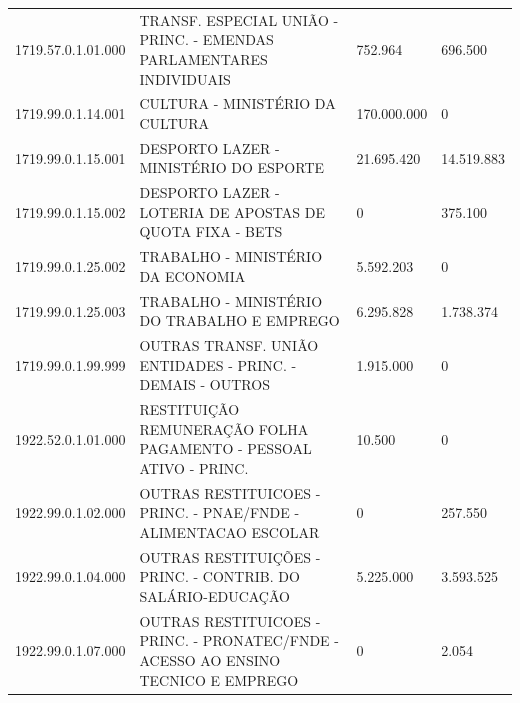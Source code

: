 \documentclass{article}
\begin{document}
\begin{longtable}[c]{m{2cm}|m{11cm}|m{2cm}m{2cm}}
\multicolumn{1}{C{2cm}|}{1719.57.0.1.01.000} & \multicolumn{1}{L{11cm}|}{TRANSF. ESPECIAL UNIÃO - PRINC. - EMENDAS PARLAMENTARES INDIVIDUAIS} & \multicolumn{1}{R{2cm}|}{752.964} & \multicolumn{1}{R{2cm}}{696.500} \\
\multicolumn{1}{C{2cm}|}{1719.99.0.1.14.001} & \multicolumn{1}{L{11cm}|}{CULTURA - MINISTÉRIO DA CULTURA} & \multicolumn{1}{R{2cm}|}{170.000.000} & \multicolumn{1}{R{2cm}}{            0} \\
\multicolumn{1}{C{2cm}|}{1719.99.0.1.15.001} & \multicolumn{1}{L{11cm}|}{DESPORTO LAZER - MINISTÉRIO DO ESPORTE} & \multicolumn{1}{R{2cm}|}{21.695.420} & \multicolumn{1}{R{2cm}}{14.519.883} \\
\multicolumn{1}{C{2cm}|}{1719.99.0.1.15.002} & \multicolumn{1}{L{11cm}|}{DESPORTO LAZER - LOTERIA DE APOSTAS DE QUOTA FIXA - BETS} & \multicolumn{1}{R{2cm}|}{            0} & \multicolumn{1}{R{2cm}}{375.100} \\
\multicolumn{1}{C{2cm}|}{1719.99.0.1.25.002} & \multicolumn{1}{L{11cm}|}{TRABALHO - MINISTÉRIO DA ECONOMIA} & \multicolumn{1}{R{2cm}|}{5.592.203} & \multicolumn{1}{R{2cm}}{            0} \\
\multicolumn{1}{C{2cm}|}{1719.99.0.1.25.003} & \multicolumn{1}{L{11cm}|}{TRABALHO - MINISTÉRIO DO TRABALHO E EMPREGO} & \multicolumn{1}{R{2cm}|}{6.295.828} & \multicolumn{1}{R{2cm}}{1.738.374} \\
\multicolumn{1}{C{2cm}|}{1719.99.0.1.99.999} & \multicolumn{1}{L{11cm}|}{OUTRAS TRANSF. UNIÃO ENTIDADES - PRINC. - DEMAIS - OUTROS} & \multicolumn{1}{R{2cm}|}{1.915.000} & \multicolumn{1}{R{2cm}}{            0} \\
\multicolumn{1}{C{2cm}|}{1922.52.0.1.01.000} & \multicolumn{1}{L{11cm}|}{RESTITUIÇÃO REMUNERAÇÃO FOLHA PAGAMENTO - PESSOAL ATIVO - PRINC.} & \multicolumn{1}{R{2cm}|}{10.500} & \multicolumn{1}{R{2cm}}{            0} \\
\multicolumn{1}{C{2cm}|}{1922.99.0.1.02.000} & \multicolumn{1}{L{11cm}|}{OUTRAS RESTITUICOES - PRINC. - PNAE/FNDE - ALIMENTACAO ESCOLAR} & \multicolumn{1}{R{2cm}|}{            0} & \multicolumn{1}{R{2cm}}{257.550} \\
\multicolumn{1}{C{2cm}|}{1922.99.0.1.04.000} & \multicolumn{1}{L{11cm}|}{OUTRAS RESTITUIÇÕES - PRINC. - CONTRIB. DO SALÁRIO-EDUCAÇÃO} & \multicolumn{1}{R{2cm}|}{5.225.000} & \multicolumn{1}{R{2cm}}{3.593.525} \\
\multicolumn{1}{C{2cm}|}{1922.99.0.1.07.000} & \multicolumn{1}{L{11cm}|}{OUTRAS RESTITUICOES - PRINC. - PRONATEC/FNDE - ACESSO AO ENSINO TECNICO E EMPREGO} & \multicolumn{1}{R{2cm}|}{            0} & \multicolumn{1}{R{2cm}}{2.054} \\

\end{longtable}
\end{document}
